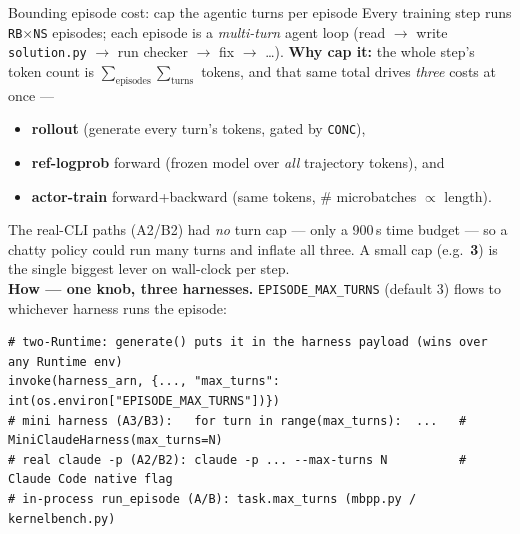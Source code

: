 \documentclass[aspectratio=169]{beamer}
\begin{document}
\begin{frame}[fragile]{Bounding episode cost: cap the agentic turns per episode}
  \footnotesize Every training step runs \texttt{RB}$\times$\texttt{NS} episodes; each episode is a
  \emph{multi-turn} agent loop (read $\to$ write \texttt{solution.py} $\to$ run checker $\to$ fix
  $\to$ \ldots). \textbf{Why cap it:} the whole step's token count is $\sum_{\text{episodes}}\sum_{\text{turns}}$
  tokens, and that same total drives \emph{three} costs at once ---
  \begin{itemize}\scriptsize
    \item \textbf{rollout} (generate every turn's tokens, gated by \texttt{CONC}),
    \item \textbf{ref-logprob} forward (frozen model over \emph{all} trajectory tokens), and
    \item \textbf{actor-train} forward+backward (same tokens, \# microbatches $\propto$ length).
  \end{itemize}
  \vspace{-0.2em}The real-CLI paths (A2/B2) had \emph{no} turn cap --- only a 900\,s time budget --- so a
  chatty policy could run many turns and inflate all three. A small cap (e.g.\ \textbf{3}) is the single
  biggest lever on wall-clock per step.
  \vspace{0.2em}\\ \textbf{How --- one knob, three harnesses.} \texttt{EPISODE\_MAX\_TURNS} (default 3) flows
  to whichever harness runs the episode:
\begin{lstlisting}[basicstyle=\ttfamily\scriptsize]
# two-Runtime: generate() puts it in the harness payload (wins over any Runtime env)
invoke(harness_arn, {..., "max_turns": int(os.environ["EPISODE_MAX_TURNS"])})
# mini harness (A3/B3):   for turn in range(max_turns):  ...   # MiniClaudeHarness(max_turns=N)
# real claude -p (A2/B2): claude -p ... --max-turns N          # Claude Code native flag
# in-process run_episode (A/B): task.max_turns (mbpp.py / kernelbench.py)
\end{lstlisting}
\end{frame}

\end{document}
